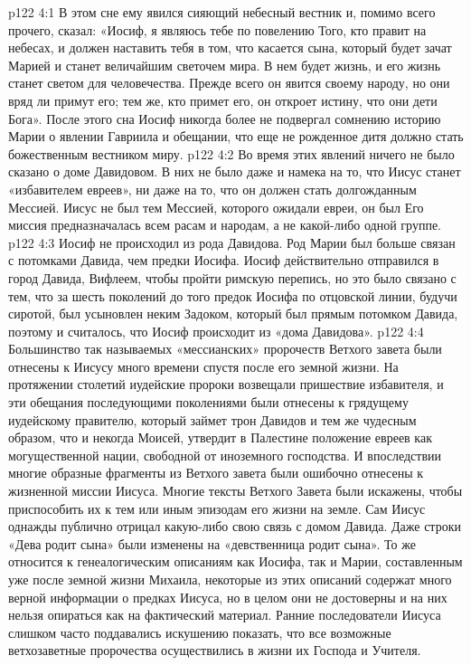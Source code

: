 \vs p122 4:1 В этом сне ему явился сияющий небесный вестник и, помимо всего прочего, сказал: «Иосиф, я являюсь тебе по повелению Того, кто правит на небесах, и должен наставить тебя в том, что касается сына, который будет зачат Марией и станет величайшим светочем мира. В нем будет жизнь, и его жизнь станет светом для человечества. Прежде всего он явится своему народу, но они вряд ли примут его; тем же, кто примет его, он откроет истину, что они дети Бога». После этого сна Иосиф никогда более не подвергал сомнению историю Марии о явлении Гавриила и обещании, что еще не рожденное дитя должно стать божественным вестником миру.
\vs p122 4:2 \pc Во время этих явлений ничего не было сказано о доме Давидовом. В них не было даже и намека на то, что Иисус станет «избавителем евреев», ни даже на то, что он должен стать долгожданным Мессией. Иисус не был тем Мессией, которого ожидали евреи, он был  Его миссия предназначалась всем расам и народам, а не какой\hyp{}либо одной группе.
\vs p122 4:3 Иосиф не происходил из рода Давидова. Род Марии был больше связан с потомками Давида, чем предки Иосифа. Иосиф действительно отправился в город Давида, Вифлеем, чтобы пройти римскую перепись, но это было связано с тем, что за шесть поколений до того предок Иосифа по отцовской линии, будучи сиротой, был усыновлен неким Задоком, который был прямым потомком Давида, поэтому и считалось, что Иосиф происходит из «дома Давидова».
\vs p122 4:4 Большинство так называемых «мессианских» пророчеств Ветхого завета были отнесены к Иисусу много времени спустя после его земной жизни. На протяжении столетий иудейские пророки возвещали пришествие избавителя, и эти обещания последующими поколениями были отнесены к грядущему иудейскому правителю, который займет трон Давидов и тем же чудесным образом, что и некогда Моисей, утвердит в Палестине положение евреев как могущественной нации, свободной от иноземного господства. И впоследствии многие образные фрагменты из Ветхого завета были ошибочно отнесены к жизненной миссии Иисуса. Многие тексты Ветхого Завета были искажены, чтобы приспособить их к тем или иным эпизодам его жизни на земле. Сам Иисус однажды публично отрицал какую\hyp{}либо свою связь с домом Давида. Даже строки «Дева родит сына» были изменены на «девственница родит сына». То же относится к генеалогическим описаниям как Иосифа, так и Марии, составленным уже после земной жизни Михаила, некоторые из этих описаний содержат много верной информации о предках Иисуса, но в целом они не достоверны и на них нельзя опираться как на фактический материал. Ранние последователи Иисуса слишком часто поддавались искушению показать, что все возможные ветхозаветные пророчества осуществились в жизни их Господа и Учителя.

